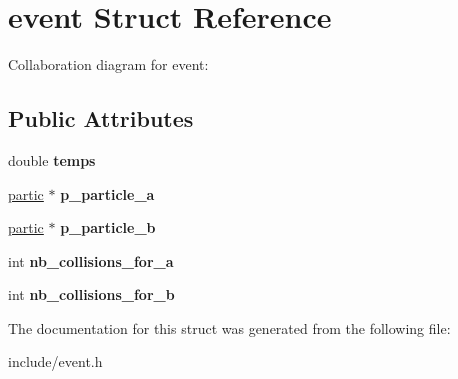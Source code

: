 \hypertarget{structevent}{}\section{event Struct Reference}
\label{structevent}


Collaboration diagram for event\+:
\subsection*{Public Attributes}
\begin{DoxyCompactItemize}
\item 
double {\bfseries temps}\hypertarget{structevent_a8f314456be889c702b4055e9968ce112}{}\label{structevent_a8f314456be889c702b4055e9968ce112}

\item 
\hyperlink{structpartic}{partic} $\ast$ {\bfseries p\+\_\+particle\+\_\+a}\hypertarget{structevent_a12fcba56083dffce447984a32ace25ae}{}\label{structevent_a12fcba56083dffce447984a32ace25ae}

\item 
\hyperlink{structpartic}{partic} $\ast$ {\bfseries p\+\_\+particle\+\_\+b}\hypertarget{structevent_a542b8e9de34c7562e7e1acc0b17e7c4f}{}\label{structevent_a542b8e9de34c7562e7e1acc0b17e7c4f}

\item 
int {\bfseries nb\+\_\+collisions\+\_\+for\+\_\+a}\hypertarget{structevent_a2e1a814ae9ddca9c60c9a13227752293}{}\label{structevent_a2e1a814ae9ddca9c60c9a13227752293}

\item 
int {\bfseries nb\+\_\+collisions\+\_\+for\+\_\+b}\hypertarget{structevent_a12ef47e13590d3c6b5f3c429d93e53c7}{}\label{structevent_a12ef47e13590d3c6b5f3c429d93e53c7}

\end{DoxyCompactItemize}


The documentation for this struct was generated from the following file\+:\begin{DoxyCompactItemize}
\item 
include/event.\+h\end{DoxyCompactItemize}
